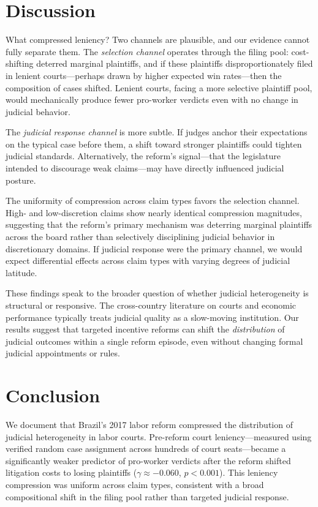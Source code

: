 \documentclass[12pt]{article}
\begin{document}
\section{Discussion}

What compressed leniency? Two channels are plausible, and our evidence cannot fully separate them. The \textit{selection channel} operates through the filing pool: cost-shifting deterred marginal plaintiffs, and if these plaintiffs disproportionately filed in lenient courts---perhaps drawn by higher expected win rates---then the composition of cases shifted. Lenient courts, facing a more selective plaintiff pool, would mechanically produce fewer pro-worker verdicts even with no change in judicial behavior.

The \textit{judicial response channel} is more subtle. If judges anchor their expectations on the typical case before them, a shift toward stronger plaintiffs could tighten judicial standards. Alternatively, the reform's signal---that the legislature intended to discourage weak claims---may have directly influenced judicial posture.

The uniformity of compression across claim types favors the selection channel. High- and low-discretion claims show nearly identical compression magnitudes, suggesting that the reform's primary mechanism was deterring marginal plaintiffs across the board rather than selectively disciplining judicial behavior in discretionary domains. If judicial response were the primary channel, we would expect differential effects across claim types with varying degrees of judicial latitude.

These findings speak to the broader question of whether judicial heterogeneity is structural or responsive. The cross-country literature on courts and economic performance \citep{djankov2003, ponticelli2017} typically treats judicial quality as a slow-moving institution. Our results suggest that targeted incentive reforms can shift the \textit{distribution} of judicial outcomes within a single reform episode, even without changing formal judicial appointments or rules.

\section{Conclusion}

We document that Brazil's 2017 labor reform compressed the distribution of judicial heterogeneity in labor courts. Pre-reform court leniency---measured using verified random case assignment across hundreds of court seats---became a significantly weaker predictor of pro-worker verdicts after the reform shifted litigation costs to losing plaintiffs ($\gamma \approx -0.060$, $p < 0.001$). This leniency compression was uniform across claim types, consistent with a broad compositional shift in the filing pool rather than targeted judicial response.
\end{document}
